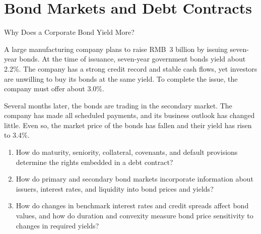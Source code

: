 \chapter{Bond Markets and Debt Contracts}
\label{chap:Bond_Markets_and_Debt_Contracts}

\begin{openingcase}{Why Does a Corporate Bond Yield More?}

A large manufacturing company plans to raise RMB~3 billion by issuing seven-year bonds. At the time of issuance, seven-year government bonds yield about 2.2\%. The company has a strong credit record and stable cash flows, yet investors are unwilling to buy its bonds at the same yield. To complete the issue, the company must offer about 3.0\%.

Several months later, the bonds are trading in the secondary market. The company has made all scheduled payments, and its business outlook has changed little. Even so, the market price of the bonds has fallen and their yield has risen to 3.4\%.

\end{openingcase}


\begin{tcolorbox}[
  enhanced,
  colback=FinanceBlue!6,
  colframe=FinanceBlue,
  boxrule=0.6pt,
  sharp corners,
  left=8pt,
  right=8pt,
  top=7pt,
  bottom=7pt,
  before skip=1em,
  after skip=1.6em,
  title=\textbf{Core Questions},
  coltitle=white,
  colbacktitle=FinanceBlue,
  fonttitle=\bfseries,
  attach boxed title to top left={xshift=6pt,yshift=-2mm},
  boxed title style={
    boxrule=0pt,
    sharp corners,
    left=5pt,
    right=5pt,
    top=2pt,
    bottom=2pt
  }
]
\begin{enumerate}[
  leftmargin=*,
  label=\textcolor{FinanceBlue}{\textbf{\arabic*.}},
  itemsep=0.55em,
  topsep=0.2em
]

\item How do maturity, seniority, collateral, covenants, and default provisions determine the rights embedded in a debt contract?

\item How do primary and secondary bond markets
incorporate information about issuers, interest
rates, and liquidity into bond prices and yields?

\item How do changes in benchmark interest rates
and credit spreads affect bond values, and how
do duration and convexity measure bond price
sensitivity to changes in required yields?

\end{enumerate}
\end{tcolorbox}

